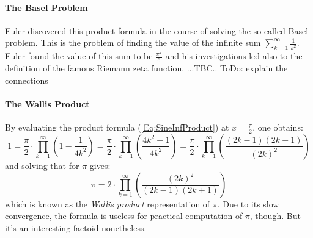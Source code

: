 \paragraph{The Basel Problem}
Euler discovered this product formula in the course of solving the so called Basel problem. This is the problem of finding the value of the infinite sum $\sum_{k=1}^{\infty} \frac{1}{k^2}$. Euler found the value of this sum to be $\frac{\pi^2}{6}$ and his investigations led also to the definition of the famous Riemann zeta function. ...TBC.. ToDo: explain the connections

\paragraph{The Wallis Product}
By evaluating the product formula (\ref{Eq:SineInfProduct}) at $x = \frac{\pi}{2}$, one obtains:
\begin{equation}
 1 = \frac{\pi}{2} \cdot \prod_{k=1}^{\infty} \left( 1 - \frac{1}{4 k^2}  \right)
   = \frac{\pi}{2} \cdot \prod_{k=1}^{\infty} \left( \frac{4 k^2 - 1}{4 k^2}  \right)
   = \frac{\pi}{2} \cdot \prod_{k=1}^{\infty} \left( \frac{(2k-1)(2k+1)}{(2k)^2}  \right)   
\end{equation}
and solving that for $\pi$ gives:
\begin{equation}
\pi = 2 \cdot \prod_{k=1}^{\infty} \left( \frac{(2k)^2 }{(2k-1)(2k+1)} \right)   
\end{equation}
which is known as the \emph{Wallis product} representation of $\pi$. Due to its slow convergence, the formula is useless for practical computation of $\pi$, though. But it's an interesting factoid nonetheless. 





